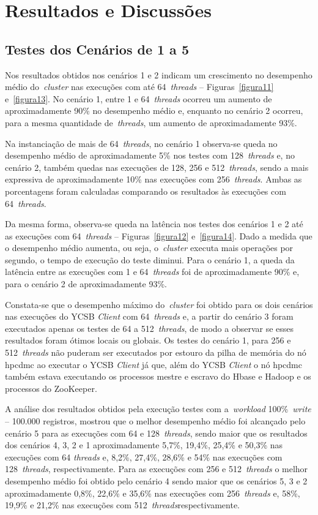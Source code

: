 \documentclass[12pt]{article}
\begin{document}
\section{Resultados e Discussões}
\label{sec:resultados}

\subsection{Testes dos Cenários de 1 a 5}

Nos resultados obtidos nos cenários 1 e 2 indicam um crescimento no desempenho médio do~\emph{cluster} nas execuções com até 64~\emph{threads} -- Figuras~\ref{figura11} e~\ref{figura13}. No cenário 1, entre 1 e 64~\emph{threads} ocorreu um aumento de aproximadamente 90\% no desempenho médio e, enquanto no cenário 2 ocorreu, para a mesma quantidade de~\emph{threads}, um aumento de aproximadamente 93\%.

Na instanciação de mais de 64~\emph{threads}, no cenário 1 observa-se queda no desempenho médio de aproximadamente 5\% nos testes com 128~\emph{threads} e, no cenário 2, também quedas nas execuções de 128, 256 e 512~\emph{threads}, sendo a mais expressiva de aproximadamente 10\% nas execuções com 256~\emph{threads}. Ambas as porcentagens foram calculadas comparando os resultados às execuções com 64~\emph{threads}.

Da mesma forma, observa-se queda na latência nos testes dos cenários 1 e 2 até as execuções com 64~\emph{threads} -- Figuras~\ref{figura12} e~\ref{figura14}. Dado a medida que o desempenho médio aumenta, ou seja, o~\emph{cluster} executa mais operações por segundo, o tempo de execução do teste diminui. Para o cenário 1, a queda da latência entre as execuções com 1 e 64~\emph{threads} foi de aproximadamente 90\% e, para o cenário 2 de aproximadamente 93\%.

Constata-se que o desempenho máximo do~\emph{cluster}  foi obtido para os dois cenários nas execuções do YCSB \textit{Client} com 64~\emph{threads} e, a partir do cenário 3 foram executados apenas os testes de 64 a 512~\emph{threads}, de modo a observar se esses resultados foram ótimos locais ou globais. Os testes do cenário 1, para 256 e 512~\emph{threads} não puderam ser executados por estouro da pilha de memória do nó hpcdmc ao executar o YCSB \textit{Client} já que, além do YCSB \textit{Client} o nó hpcdmc também estava executando os processos mestre e escravo do Hbase e Hadoop e os processos do ZooKeeper.

A análise dos resultados obtidos pela execução testes com a~\emph{workload} 100\%~\emph{write} -- 100.000 registros, mostrou que o melhor desempenho médio foi alcançado pelo cenário 5 para as execuções com 64 e 128~\emph{threads}, sendo maior que os resultados dos cenários 4, 3, 2 e 1 aproximadamente 5,7\%, 19,4\%, 25,4\% e 50,3\% nas execuções com 64 \emph{threads} e, 8,2\%, 27,4\%, 28,6\% e 54\% nas execuções com 128~\emph{threads}, respectivamente. Para as execuções com 256 e 512~\emph{threads} o melhor desempenho médio foi obtido pelo cenário 4 sendo maior que os cenários 5, 3 e 2 aproximadamente 0,8\%, 22,6\% e 35,6\% nas execuções com 256~\emph{threads} e, 58\%, 19,9\% e 21,2\% nas execuções com 512~\emph{threads}respectivamente.
\end{document}
